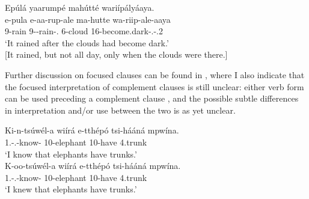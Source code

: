\documentclass[output=paper]{langscibook}
\begin{document}
 \citep[57]{vanderWal2014}
\z

\ea
\label{bkm:Ref95810696}
Epúlá yaarumpé mahútté wariípályáaya.\\
\gll
e-pula  e-aa-rup-ale  ma-hutte  wa{\footnotemark}-riip-ale-aaya\\
9-rain  9\SM{}-\PST{}-rain-\PFV{}.\CJ{}  6-cloud  16-become.dark-\PFV{}.\REL{}-\POSS{}.2\\
\glt
‘It rained after the clouds had become dark.’\\
{}[It rained, but not all day, only when the clouds were there.] \citep[59]{vanderWal2014}

\z

Further discussion on focused clauses can be found in \citet{vanderWal2014}, where I also indicate that the focused interpretation of complement clauses is still unclear: either verb form can be used preceding a complement clause , and the possible subtle differences in interpretation and/or use between the two is as yet unclear.

\ea
\label{bkm:Ref95811763}
\begin{xlist}
\exi{\CJ{}}
\gll
Ki-n-tsúwél-a  wiírá  e-tthépó  tsi-hááná  mpwína.\\
1\SG{}.\SM{}-\PRS{}.\CJ{}-know-\FV{}  \COMP{}  10-elephant  10\SM{}-have  4.trunk\\
\glt
‘I know that elephants have trunks.’\\

\exi{\DJ{}}
\gll
K-oo-tsúwél-a  wiírá  e-tthépó  tsi-hááná  mpwína.\\
1\SG{}.\SM{}-\PFV{}.\DJ{}-know-\FV{}  \COMP{}  10-elephant  10\SM{}-have  4.trunk\\
\glt
‘I knew that elephants have trunks.’ \citep[60]{vanderWal2014}\\
\end{xlist}

\z
\end{document}
